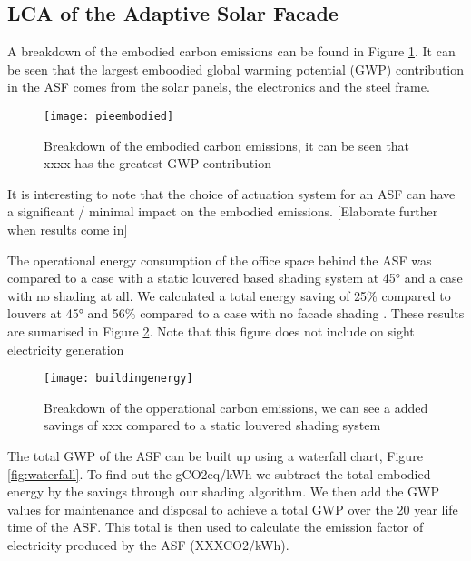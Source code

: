 
\subsection{LCA of the Adaptive Solar Facade}

A breakdown of the embodied carbon emissions can be found in Figure  \ref{fig:embodied}. It can be seen that the largest emboodied global warming potential (GWP) contribution in the ASF comes from the solar panels, the electronics and the steel frame. 

\begin{figure}[H]
\begin{center}
\texttt{[image: pieembodied]}
\caption{Breakdown of the embodied carbon emissions, it can be seen that xxxx has the greatest GWP contribution}
\label{fig:embodied}
\end{center}
\end{figure}


It is interesting to note that the choice of actuation system for an ASF can have a significant / minimal impact on the embodied emissions. [Elaborate further when results come in]

The operational energy consumption of the office space behind the ASF was compared to a case with a static louvered based shading system at 45° and a case with no shading at all. We calculated a total energy saving of 25\% compared to louvers at 45° and 56\% compared to a case with no facade shading \cite{jayathissa2015abs}. These results are sumarised in Figure \ref{fig:operational}. Note that this figure does not include on sight electricity generation 


\begin{figure}[H]
\begin{center}
\texttt{[image: buildingenergy]}
\caption{Breakdown of the opperational carbon emissions, we can see a added savings of xxx compared to a static louvered shading system}
\label{fig:operational}
\end{center}
\end{figure}

The total GWP of the ASF can be built up using a waterfall chart, Figure \ref{fig:waterfall}. To find out the gCO2eq/kWh we subtract the total embodied energy by the savings through our shading algorithm. We then add the GWP values for maintenance and disposal to achieve a total GWP over the 20 year life time of the ASF. This total is then used to calculate the emission factor of electricity produced by the ASF (XXXCO2/kWh).\\

